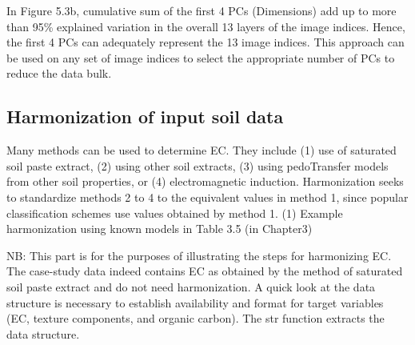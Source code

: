 \documentclass[
  10pt,
  b5paper,
]{book}
\newenvironment{Shaded}{\begin{snugshade}}{\end{snugshade}}
\newcommand{\CommentTok}[1]{\textcolor[rgb]{0.56,0.35,0.01}{\textit{#1}}}
\newcommand{\DecValTok}[1]{\textcolor[rgb]{0.00,0.00,0.81}{#1}}
\newcommand{\KeywordTok}[1]{\textcolor[rgb]{0.13,0.29,0.53}{\textbf{#1}}}
\newcommand{\NormalTok}[1]{#1}
\newcommand{\OperatorTok}[1]{\textcolor[rgb]{0.81,0.36,0.00}{\textbf{#1}}}
\begin{document}
In Figure 5.3b, cumulative sum of the first 4 PCs (Dimensions) add up to more than 95\% explained variation in the overall 13 layers of the image indices. Hence, the first 4 PCs can adequately represent the 13 image indices. This approach can be used on any set of image indices to select the appropriate number of PCs to reduce the data bulk.

\begin{Shaded}
\end{Shaded}

\hypertarget{harmonization-of-input-soil-data}{%
\subsection{Harmonization of input soil data}\label{harmonization-of-input-soil-data}}

Many methods can be used to determine EC. They include (1) use of saturated soil paste extract, (2) using other soil extracts, (3) using pedoTransfer models from other soil properties, or (4) electromagnetic induction. Harmonization seeks to standardize methods 2 to 4 to the equivalent values in method 1, since popular classification schemes use values obtained by method 1.
(1) Example harmonization using known models in Table 3.5 (in Chapter3)

NB: This part is for the purposes of illustrating the steps for harmonizing EC. The case-study data indeed contains EC as obtained by the method of saturated soil paste extract and do not need harmonization. A quick look at the data structure is necessary to establish availability and format for target variables (EC, texture components, and organic carbon). The str function extracts the data structure.
\end{document}
